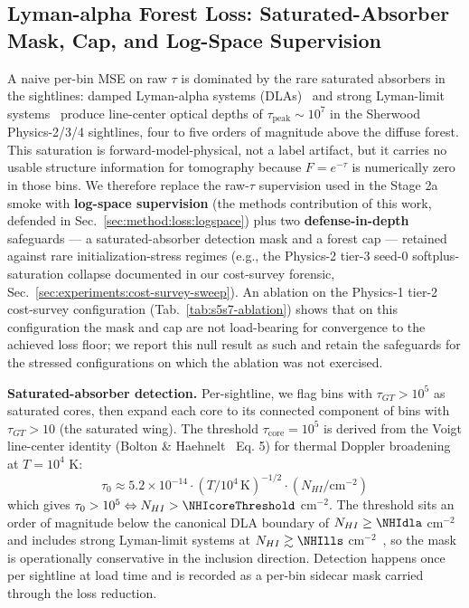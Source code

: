 \subsection{Lyman-alpha Forest Loss: Saturated-Absorber Mask, Cap, and Log-Space Supervision}
\label{sec:method:loss}
A naive per-bin MSE on raw $\tau$ is dominated by the rare saturated absorbers in the sightlines: damped Lyman-alpha systems (DLAs)~\cite{wolfe2005} and strong Lyman-limit systems~\cite{prochaska2010} produce line-center optical depths of $\tau_{\text{peak}} \sim 10^7$ in the Sherwood Physics-2/3/4 sightlines, four to five orders of magnitude above the diffuse forest. This saturation is forward-model-physical, not a label artifact, but it carries no usable structure information for tomography because $F = e^{-\tau}$ is numerically zero in those bins. We therefore replace the raw-$\tau$ supervision used in the Stage 2a smoke with \textbf{log-space supervision} (the methods contribution of this work, defended in Sec.~\ref{sec:method:loss:logspace}) plus two \textbf{defense-in-depth} safeguards --- a saturated-absorber detection mask and a forest cap --- retained against rare initialization-stress regimes (e.g., the Physics-2 tier-3 seed-0 softplus-saturation collapse documented in our cost-survey forensic, Sec.~\ref{sec:experiments:cost-survey-sweep}). An ablation on the Physics-1 tier-2 cost-survey configuration (Tab.~\ref{tab:s5s7-ablation}) shows that on this configuration the mask and cap are not load-bearing for convergence to the achieved loss floor; we report this null result as such and retain the safeguards for the stressed configurations on which the ablation was not exercised.

\textbf{Saturated-absorber detection.} Per-sightline, we flag bins with $\tau_{GT} > 10^5$ as saturated cores, then expand each core to its connected component of bins with $\tau_{GT} > 10$ (the saturated wing). The threshold $\tau_{\text{core}} = 10^5$ is derived from the Voigt line-center identity (Bolton \& Haehnelt~\cite{bolton_haehnelt2007} Eq. 5) for thermal Doppler broadening at $T = 10^4$ K:
\begin{equation}
\tau_0 \approx 5.2 \times 10^{-14} \cdot (T/10^4\,\text{K})^{-1/2} \cdot (N_{HI}/\text{cm}^{-2})
\end{equation}
which gives $\tau_0 > 10^5 \Leftrightarrow N_{HI} > \NHIcoreThreshold$ cm$^{-2}$. The threshold sits an order of magnitude below the canonical DLA boundary of $N_{HI} \geq \NHIdla$ cm$^{-2}$~\cite{wolfe2005} and includes strong Lyman-limit systems at $N_{HI} \gtrsim \NHIlls$ cm$^{-2}$~\cite{prochaska2010}, so the mask is operationally conservative in the inclusion direction. Detection happens once per sightline at load time and is recorded as a per-bin sidecar mask carried through the loss reduction.

